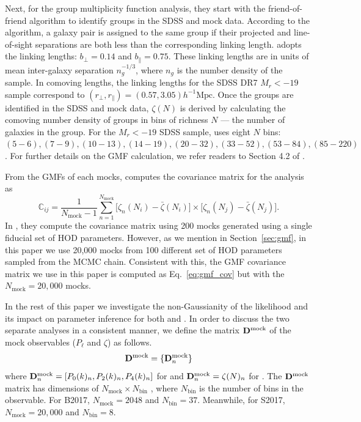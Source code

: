 \documentclass[12pt, letterpaper, preprint]{aastex}
\newcommand{\beq}{\begin{equation}}
\newcommand{\eeq}{\end{equation}}
\newcommand{\Dmock}{{\bf D}^\mathrm{mock}}
\newcommand{\Beut}{B2017}
\newcommand{\Sinh}{S2017}
\begin{document}
Next, for the \cite{sinha2017a} group multiplicity function analysis, 
they start with the \cite{berlind2006} friend-of-friend algorithm to 
identify groups in the SDSS and mock data. According to the algorithm, a 
galaxy pair is assigned to the same group if their projected and line-of-sight 
separations are both less than the corresponding linking length. \cite{sinha2017a} 
adopts the \cite{berlind2006} linking lengths: $b_\perp = 0.14$ and $b_\parallel = 0.75$.
These linking lengths are in units of  mean inter-galaxy separation 
$n_g^{-1/3}$, where $n_g$ is the number density of the sample. In comoving
lengths, the linking lengths for the SDSS DR7 $M_r < -19$ sample correspond to
$(r_\perp, r_\parallel) = (0.57, 3.05)h^{-1}\mathrm{Mpc}$. 
Once the groups are identified in the SDSS and mock data, $\zeta(N)$
is derived by calculating the comoving number density of groups 
in bins of richness $N$ --- the number of galaxies in the group. 
For the $M_r < −19$ SDSS sample, \cite{sinha2017a} uses eight $N$ bins: 
$(5 - 6), (7 - 9), (10 - 13), (14 - 19), (20 - 32), (33 - 52), (53 - 84), (85 - 220)$.
For further details on the GMF calculation, we refer readers to Section 4.2
of \cite{sinha2017a}. 

From the GMFs of each mocks, \cite{sinha2017a} computes the covariance
matrix for the analysis as 
\beq \label{eq:gmf_cov} 
\mathbb{C}_{ij} = \frac{1}{N_\mathrm{mock} -1} \sum\limits_{n=1}^{N_\mathrm{mock}} \big[\zeta_n(N_i) -  \bar{\zeta}(N_i)\big] \times
    \big[\zeta_n(N_j) -  \bar{\zeta}(N_j)\big].
\eeq
In \cite{sinha2017a}, they compute the covariance matrix using 200 mocks
generated using a single fiducial set of HOD parameters. However, as we 
mention in Section~\ref{sec:gmf}, in this paper we use 20,000 mocks from 
100 different set of HOD parameters sampled from the MCMC chain. Consistent
with this, the GMF covariance matrix we use in this paper is computed as
Eq.~\ref{eq:gmf_cov} but with the $N_\mathrm{mock} = 20,000$ mocks. 

In the rest of this paper we investigate the non-Gaussianity of the 
likelihood and its impact on parameter inference for both \cite{beutler2017} 
and \cite{sinha2017a}. In order to discuss the two separate analyses
in a consistent manner, we define the matrix $\Dmock$ of 
the mock observables ($P_\ell$ and $\zeta$) as follows. 
\beq
\Dmock = \{{\bf D}^\mathrm{mock}_n\}
\eeq
where $\Dmock_n = [P_0(k)_n,P_2(k)_n,P_4(k)_n]$ for 
\cite{beutler2017} and $\Dmock_n = \zeta(N)_n$ for 
\cite{sinha2017a}. The $\Dmock$ matrix has dimensions of 
$N_\mathrm{mock} \times N_\mathrm{bin}$ , where $N_\mathrm{bin}$
is the number of bins in the observable. For \Beut, 
$N_\mathrm{mock} = 2048$ and $N_\mathrm{bin} = 37$. Meanwhile, 
for \Sinh, $N_\mathrm{mock} = 20,000$ and $N_\mathrm{bin} = 8$.
\end{document}
